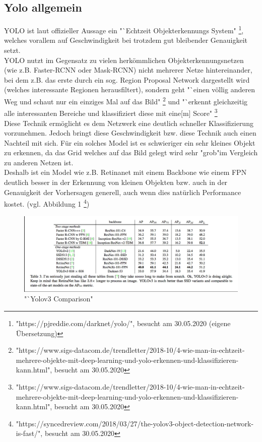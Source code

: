 \documentclass[a4paper,oneside,12pt]{report}
\begin{document}
\begin{onehalfspace}
		\subsection*{Yolo allgemein}
		YOLO ist laut offizieller Aussage ein "`Echtzeit Objekterkennungs System"
		\footnote{"https://pjreddie.com/darknet/yolo/", besucht am 30.05.2020 (eigene Übersetzung)},
		welches vorallem auf Geschwindigkeit bei trotzdem gut bleibender Genauigkeit setzt.\\
		YOLO nutzt im Gegensatz zu vielen herkömmlichen Objekterkennungsnetzen (wie z.B. Faster-RCNN oder Mask-RCNN) nicht mehrerer Netze hintereinander, bei dem z.B. das erste durch ein sog. Region Proposal Network dargestellt wird (welches interessante Regionen herausfiltert), sondern geht "`einen völlig anderen Weg und schaut nur ein einziges Mal auf das Bild"
		\footnote{"https://www.sigs-datacom.de/trendletter/2018-10/4-wie-man-in-echtzeit-mehrere-objekte-mit-deep-learning-und-yolo-erkennen-und-klassifizieren-kann.html", besucht am 30.05.2020}
		und "`erkennt gleichzeitig alle interessanten Bereiche und klassifiziert diese mit eine[m] Score"
		\footnote{"https://www.sigs-datacom.de/trendletter/2018-10/4-wie-man-in-echtzeit-mehrere-objekte-mit-deep-learning-und-yolo-erkennen-und-klassifizieren-kann.html", besucht am 30.05.2020}\\
		Diese Technik ermöglicht es dem Netzwerk eine deutlich schneller Klassifizierung vorzunehmen. \clearpage
		Jedoch bringt diese Geschwindigkeit bzw. diese Technik auch einen Nachteil mit sich. Für ein solches Model ist es schwieriger ein sehr kleines Objekt zu erkennen, da das Grid welches auf das Bild gelegt wird sehr "grob"\space im Vergleich zu anderen Netzen ist. \\
		Deshalb ist ein Model wie z.B. Retinanet mit einem Backbone wie einem FPN deutlich besser in der Erkennung von kleinen Objekten bzw. auch in der Genauigkeit der Vorhersagen generell, auch wenn dies natürlich Performance kostet. (vgl. Abbildung 1
		\footnote{"https://syncedreview.com/2018/03/27/the-yolov3-object-detection-network-is-fast/", besucht am 30.05.2020})\\
		\begin{figure}[h!]
			\includegraphics[width=\linewidth]{Comparison.png}
			\caption{"`Yolov3 Comparison"}
			\label{fig:comparison}
		\end{figure}

\end{onehalfspace}
\end{document}
